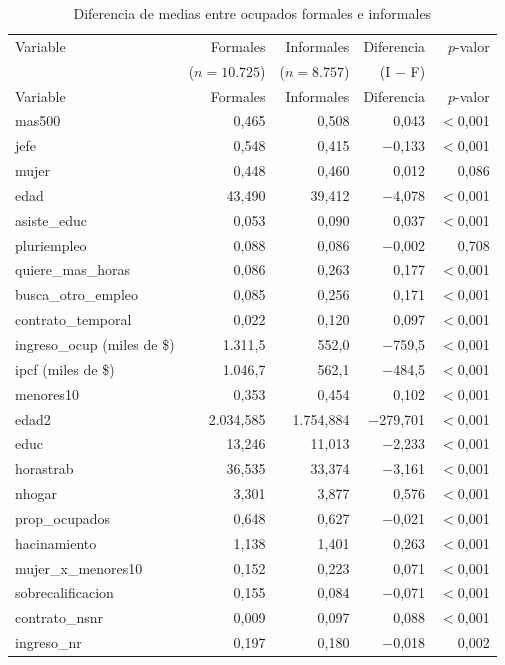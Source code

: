 \begin{longtable}{lrrrr}
\caption{Diferencia de medias entre ocupados formales e informales}\label{tab:medias}\\
\toprule
Variable & Formales & Informales & Diferencia & $p$-valor \\
 & ($n=10.725$) & ($n=8.757$) & (I $-$ F) & \\
\midrule
\endfirsthead
\toprule Variable & Formales & Informales & Diferencia & $p$-valor \\ \midrule
\endhead
\bottomrule
\endlastfoot
mas500 & 0,465 & 0,508 & 0,043 & $<$0,001 \\
jefe & 0,548 & 0,415 & $-$0,133 & $<$0,001 \\
mujer & 0,448 & 0,460 & 0,012 & 0,086 \\
edad & 43,490 & 39,412 & $-$4,078 & $<$0,001 \\
asiste\_educ & 0,053 & 0,090 & 0,037 & $<$0,001 \\
pluriempleo & 0,088 & 0,086 & $-$0,002 & 0,708 \\
quiere\_mas\_horas & 0,086 & 0,263 & 0,177 & $<$0,001 \\
busca\_otro\_empleo & 0,085 & 0,256 & 0,171 & $<$0,001 \\
contrato\_temporal & 0,022 & 0,120 & 0,097 & $<$0,001 \\
ingreso\_ocup (miles de \$) & 1.311,5 & 552,0 & $-$759,5 & $<$0,001 \\
ipcf (miles de \$) & 1.046,7 & 562,1 & $-$484,5 & $<$0,001 \\
menores10 & 0,353 & 0,454 & 0,102 & $<$0,001 \\
edad2 & 2.034,585 & 1.754,884 & $-$279,701 & $<$0,001 \\
educ & 13,246 & 11,013 & $-$2,233 & $<$0,001 \\
horastrab & 36,535 & 33,374 & $-$3,161 & $<$0,001 \\
nhogar & 3,301 & 3,877 & 0,576 & $<$0,001 \\
prop\_ocupados & 0,648 & 0,627 & $-$0,021 & $<$0,001 \\
hacinamiento & 1,138 & 1,401 & 0,263 & $<$0,001 \\
mujer\_x\_menores10 & 0,152 & 0,223 & 0,071 & $<$0,001 \\
sobrecalificacion & 0,155 & 0,084 & $-$0,071 & $<$0,001 \\
contrato\_nsnr & 0,009 & 0,097 & 0,088 & $<$0,001 \\
ingreso\_nr & 0,197 & 0,180 & $-$0,018 & 0,002 \\

\end{longtable}
